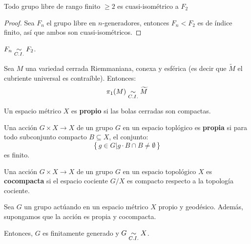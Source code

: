 \documentclass[12pt]{report}
\newcounter{it}
\theoremstyle{largebreak}
\begin{document}
    \begin{propo}
        Todo grupo libre de rango finito $\geq2$ es cuasi-isométrico a $F_2$
    \end{propo}

    \begin{proof}
        Sea $F_n$ el grupo libre en $n$-generadores, entonces $F_n<F_2$ es de índice finito, así que ambos son cuasi-isométricos.
    \end{proof}

    \begin{cor}
        $F_n\underset{C.I.}{\sim} F_2$.
    \end{cor}

    \begin{theor}
        Sea $M$ una variedad cerrada Riemmaniana, conexa y esférica (es decir que $\widetilde{M}$ el cubriente universal es contraíble). Entonces:
        \begin{equation*}
            \pi_1(M)\underset{C.I.}{\sim}\widetilde{ M}
        \end{equation*}
    \end{theor}

    \begin{mydef}
        Un espacio métrico $X$ es \textbf{propio} si las bolas cerradas son compactas.
    \end{mydef}

    \begin{mydef}
        Una acción $G\times X\rightarrow X$ de un grupo $G$ en un espacio toplógico es \textbf{propia} si para todo subconjunto compacto $B\subseteq X$, el conjunto:
        \begin{equation*}
            \left\{g\in G\Big|g\cdot B\cap B\neq\emptyset \right\}
        \end{equation*}
        es finito.
    \end{mydef}

    \begin{mydef}
        Una acción $G\times X\rightarrow X$ de un grupo $G$ en un espacio topológico $X$ es \textbf{cocompacta} si el espacio cociente $G/X$ es compacto respecto a la topología cociente. 
    \end{mydef}

    \begin{lema}
        Sea $G$ un grupo actúando en un espacio métrico $X$ propio y geodésico. Además, supongamos que la acción es propia y cocompacta.

        Entonces, $G$ es finitamente generado y $G\underset{C.I.}{\sim} X$.
    \end{lema}
\end{document}
